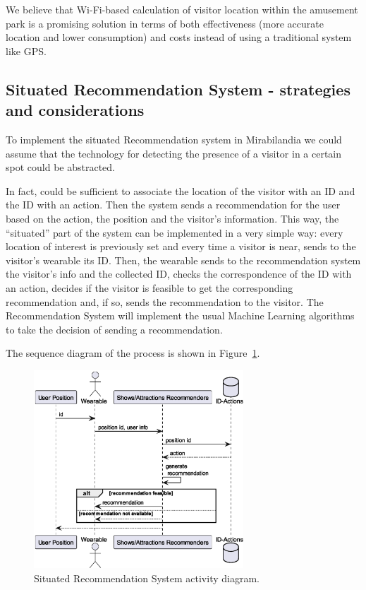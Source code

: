 We believe that Wi-Fi-based calculation of visitor location within the amusement park is a promising solution in terms of both effectiveness (more
accurate location and lower consumption) and costs instead of using a traditional system like GPS.

\newpage

\subsection{Situated Recommendation System - strategies and considerations}\label{sec:situated-recommendation-sys}
To implement the situated Recommendation system in Mirabilandia we could assume that the technology for detecting the presence of a visitor in a
certain spot could be abstracted.

In fact, could be sufficient to associate the location of the visitor with an ID and the ID with an action. Then the system sends a recommendation
for the user based on the action, the position and the visitor's information.
This way, the ``situated'' part of the system can be
implemented in a very simple way: every location of interest is previously set and every time a visitor is near, sends to the visitor's wearable its
ID. Then, the wearable sends to the recommendation system the visitor's info and the collected ID, checks the correspondence of the ID with an
action, decides if the visitor is feasible to get the corresponding recommendation and, if so, sends the recommendation to the visitor. The
Recommendation System will implement the usual Machine Learning algorithms to take the decision of sending a recommendation.

The sequence diagram of the process is shown in Figure~\ref{fig:situated-recommendation}.

\begin{figure}[H]
	\centering
	\includegraphics[width=0.7\textwidth]{img/seq_diag_situated.eps}
	\caption{Situated Recommendation System activity diagram.}
	\label{fig:situated-recommendation}
\end{figure}

